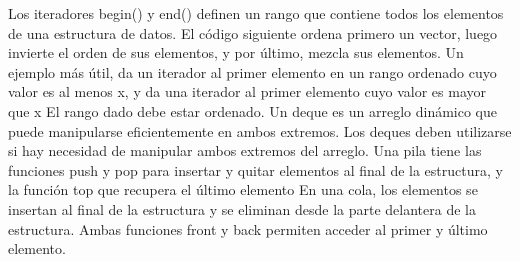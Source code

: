 {}Los iteradores begin() y end() definen un rango que contiene todos los elementos de una estructura de datos.\markdownRendererParagraphSeparator
{}El código siguiente ordena primero un vector, luego invierte el orden de sus elementos, y por último, mezcla sus elementos.\markdownRendererInterblockSeparator
{}\markdownRendererInterblockSeparator
{}Un ejemplo más útil, da un iterador al primer elemento en un rango ordenado cuyo valor es al menos x, y  da una\markdownRendererSoftLineBreak
{}iterador al primer elemento cuyo valor es mayor que x\markdownRendererInterblockSeparator
{}\markdownRendererInterblockSeparator
{}El rango dado debe estar ordenado.\markdownRendererInterblockSeparator
{}
\markdownRendererSectionEnd 
\markdownRendererSectionEnd \markdownRendererSectionBegin
{}\markdownRendererInterblockSeparator
{}Un deque es un arreglo dinámico que puede manipularse eficientemente en ambos extremos.\markdownRendererParagraphSeparator
{}Los deques deben utilizarse si hay necesidad de manipular ambos extremos del arreglo.\markdownRendererInterblockSeparator
{}\markdownRendererParagraphSeparator
{}
\markdownRendererSectionEnd \markdownRendererSectionBegin
{}\markdownRendererInterblockSeparator
{}Una pila tiene las funciones push y pop para insertar y quitar elementos al final de la estructura, y la función top que recupera el último elemento\markdownRendererInterblockSeparator
{}\markdownRendererInterblockSeparator
{}
\markdownRendererSectionEnd \markdownRendererSectionBegin
{}\markdownRendererInterblockSeparator
{}En una cola, los elementos se insertan al final de la estructura y se eliminan desde la parte delantera de la estructura. Ambas funciones front y back permiten acceder al primer y último elemento.\markdownRendererInterblockSeparator
{}\markdownRendererInterblockSeparator
{}
\markdownRendererSectionEnd 
\markdownRendererSectionEnd \markdownRendererSectionBegin
